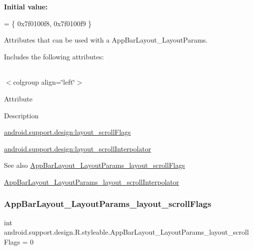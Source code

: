 {\bfseries Initial value\+:}
\begin{DoxyCode}
= \{
            0x7f0100f8, 0x7f0100f9
        \}
\end{DoxyCode}
Attributes that can be used with a App\+Bar\+Layout\+\_\+\+Layout\+Params. 

Includes the following attributes\+:

\tabulinesep=1mm
\begin{longtabu} spread 0pt [c]{*{0}{|X[-1]}|}
\hline
\end{longtabu}
$<$colgroup align=\char`\"{}left\char`\"{}$>$ 

Attribute

Description 

{\ttfamily \hyperlink{classandroid_1_1support_1_1design_1_1R_1_1styleable_a74a85544b430e28f06360cfcd794314d}{android.\+support.\+design\+:layout\+\_\+scroll\+Flags}}

{\ttfamily \hyperlink{classandroid_1_1support_1_1design_1_1R_1_1styleable_a5f19dcedddd78f620c09f1472fdc29e8}{android.\+support.\+design\+:layout\+\_\+scroll\+Interpolator}}

\begin{DoxySeeAlso}{See also}
\hyperlink{classandroid_1_1support_1_1design_1_1R_1_1styleable_a74a85544b430e28f06360cfcd794314d}{App\+Bar\+Layout\+\_\+\+Layout\+Params\+\_\+layout\+\_\+scroll\+Flags} 

\hyperlink{classandroid_1_1support_1_1design_1_1R_1_1styleable_a5f19dcedddd78f620c09f1472fdc29e8}{App\+Bar\+Layout\+\_\+\+Layout\+Params\+\_\+layout\+\_\+scroll\+Interpolator} 
\end{DoxySeeAlso}
\mbox{\label{classandroid_1_1support_1_1design_1_1R_1_1styleable_a74a85544b430e28f06360cfcd794314d}} 
\subsubsection{\texorpdfstring{App\+Bar\+Layout\+\_\+\+Layout\+Params\+\_\+layout\+\_\+scroll\+Flags}{AppBarLayout\_LayoutParams\_layout\_scrollFlags}}
{\footnotesize\ttfamily int android.\+support.\+design.\+R.\+styleable.\+App\+Bar\+Layout\+\_\+\+Layout\+Params\+\_\+layout\+\_\+scroll\+Flags = 0\hspace{0.3cm}{\ttfamily [static]}}

